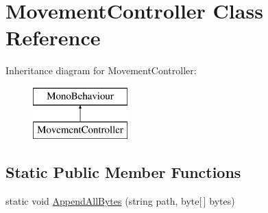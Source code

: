 \hypertarget{class_movement_controller}{}\section{Movement\+Controller Class Reference}
\label{class_movement_controller}
Inheritance diagram for Movement\+Controller\+:\begin{figure}[H]
\begin{center}
\leavevmode
\includegraphics[height=2.000000cm]{class_movement_controller}
\end{center}
\end{figure}
\subsection*{Static Public Member Functions}
\begin{DoxyCompactItemize}
\item 
static void \hyperlink{class_movement_controller_a169d1a4b063c53bce40ab6088fb26acd}{Append\+All\+Bytes} (string path, byte\mbox{[}$\,$\mbox{]} bytes)
\end{DoxyCompactItemize}
